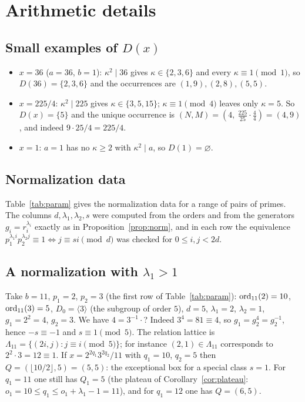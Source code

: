 \section{Arithmetic details}\label{app:arith}

\subsection{\texorpdfstring{Small examples of $D(x)$}{Small examples of D(x)}}

\begin{itemize}
\item $x=36$ ($a=36$, $b=1$): $\kappa^2\mid36$ gives $\kappa\in\{2,3,6\}$ and every $\kappa\equiv1\pmod1$, so $D(36)=\{2,3,6\}$ and the occurrences are $(1,9),(2,8),(5,5)$.
\item $x=225/4$: $\kappa^2\mid225$ gives $\kappa\in\{3,5,15\}$; $\kappa\equiv1\pmod4$ leaves only $\kappa=5$. So $D(x)=\{5\}$ and the unique occurrence is $(N,M)=(4,\ \tfrac{225}{25}\cdot\tfrac44)=(4,9)$, and indeed $9\cdot25/4=225/4$.
\item $x=1$: $a=1$ has no $\kappa\ge2$ with $\kappa^2\mid a$, so $D(1)=\varnothing$.
\end{itemize}

\subsection{Normalization data}

Table~\ref{tab:param} gives the normalization data for a range of pairs of primes. The columns $d,\lambda_1,\lambda_2,s$ were computed from the orders and from the generators $g_i=r_i^{\lambda_i}$ exactly as in Proposition~\ref{prop:norm}, and in each row the equivalence $p_1^{\lambda_1i}p_2^{\lambda_2j}\equiv1\iff j\equiv si\pmod d$ was checked for $0\le i,j<2d$.



\subsection{\texorpdfstring{A normalization with $\lambda_1>1$}{A normalization with lambda1 > 1}}

Take $b=11$, $p_1=2$, $p_2=3$ (the first row of Table~\ref{tab:param}): $\operatorname{ord}_{11}(2)=10$, $\operatorname{ord}_{11}(3)=5$, $D_0=\langle3\rangle$ (the subgroup of order $5$), $d=5$, $\lambda_1=2$, $\lambda_2=1$, $g_1=2^2=4$, $g_2=3$. We have $4=3^{-1}\cdot$? Indeed $3^4=81\equiv4$, so $g_1=g_2^4=g_2^{-1}$, hence $-s\equiv-1$ and $s\equiv1\pmod5$. The relation lattice is $\Lambda_{11}=\{(2i,j):j\equiv i\pmod5\}$; for instance $(2,1)\in\Lambda_{11}$ corresponds to $2^2\cdot3=12\equiv1$. If $x=2^{2q_1}3^{2q_2}/11$ with $q_1=10$, $q_2=5$ then $Q=(\lfloor10/2\rfloor,5)=(5,5)$: the exceptional box for a special class $s=1$. For $q_1=11$ one still has $Q_1=5$ (the plateau of Corollary~\ref{cor:plateau}: $o_1=10\le q_1\le o_1+\lambda_1-1=11$), and for $q_1=12$ one has $Q=(6,5)$.

